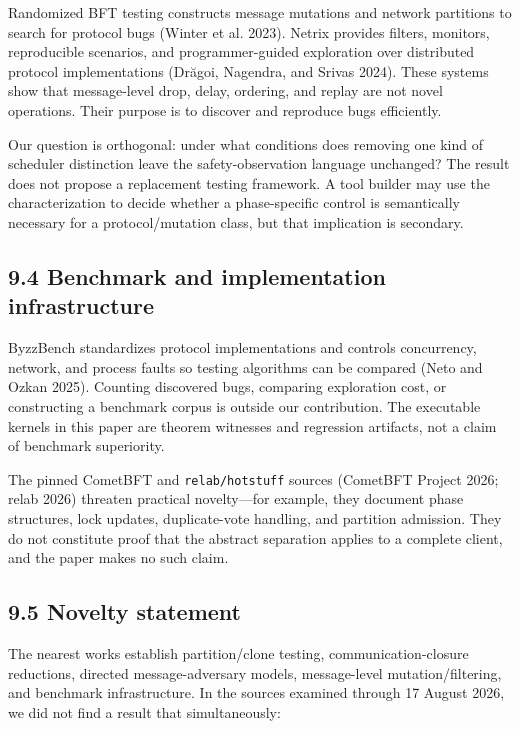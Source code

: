 \documentclass[10pt,a4paper]{article}
\begin{document}
Randomized BFT testing constructs message mutations and network
partitions to search for protocol bugs (Winter et al. 2023). Netrix
provides filters, monitors, reproducible scenarios, and
programmer-guided exploration over distributed protocol implementations
(Drăgoi, Nagendra, and Srivas 2024). These systems show that
message-level drop, delay, ordering, and replay are not novel
operations. Their purpose is to discover and reproduce bugs efficiently.

Our question is orthogonal: under what conditions does removing one kind
of scheduler distinction leave the safety-observation language
unchanged? The result does not propose a replacement testing framework.
A tool builder may use the characterization to decide whether a
phase-specific control is semantically necessary for a protocol/mutation
class, but that implication is secondary.

\subsection{9.4 Benchmark and implementation
infrastructure}\label{benchmark-and-implementation-infrastructure}

ByzzBench standardizes protocol implementations and controls
concurrency, network, and process faults so testing algorithms can be
compared (Neto and Ozkan 2025). Counting discovered bugs, comparing
exploration cost, or constructing a benchmark corpus is outside our
contribution. The executable kernels in this paper are theorem witnesses
and regression artifacts, not a claim of benchmark superiority.

The pinned CometBFT and \texttt{relab/hotstuff} sources (CometBFT
Project 2026; relab 2026) threaten practical novelty---for example, they
document phase structures, lock updates, duplicate-vote handling, and
partition admission. They do not constitute proof that the abstract
separation applies to a complete client, and the paper makes no such
claim.

\subsection{9.5 Novelty statement}\label{novelty-statement}

The nearest works establish partition/clone testing,
communication-closure reductions, directed message-adversary models,
message-level mutation/filtering, and benchmark infrastructure. In the
sources examined through 17 August 2026, we did not find a result that
simultaneously:
\end{document}
